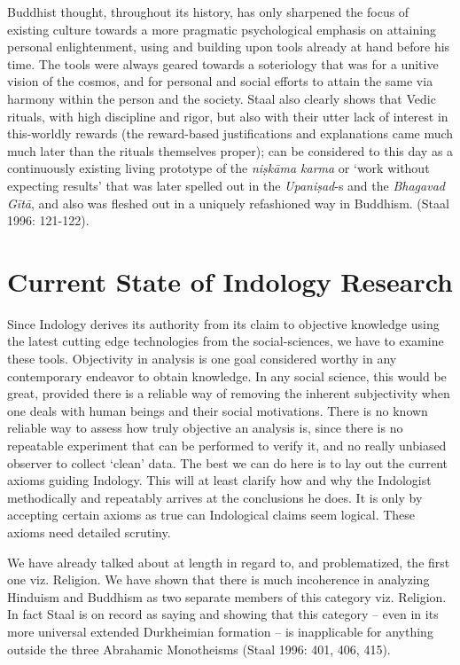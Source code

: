 Buddhist thought, throughout its history, has only sharpened the focus of existing culture towards a more pragmatic psychological emphasis on attaining personal enlightenment, using and building upon tools already at hand before his time. The tools were always geared towards a soteriology that was for a unitive vision of the cosmos, and for personal and social efforts to attain the same via harmony within the person and the society. Staal also clearly shows that Vedic rituals, with high discipline and rigor, but also with their utter lack of interest in this-worldly rewards (the reward-based justifications and explanations came much much later than the rituals themselves proper); can be considered to this day as a continuously existing living prototype of the \textit{niṣkāma karma} or ‘work without expecting results’ that was later spelled out in the \textit{Upaniṣad}-s and the \textit{Bhagavad Gītā}, and also was fleshed out in a uniquely refashioned way in Buddhism. (Staal 1996: 121-122).


\section*{Current State of Indology Research}

Since Indology derives its authority from its claim to objective knowledge using the latest cutting edge technologies from the social-sciences, we have to examine these tools. Objectivity in analysis is one goal considered worthy in any contemporary endeavor to obtain knowledge. In any social science, this would be great, provided there is a reliable way of removing the inherent subjectivity when one deals with human beings and their social motivations. There is no known reliable way to assess how truly objective an analysis is, since there is no repeatable experiment that can be performed to verify it, and no really unbiased observer to collect ‘clean’ data. The best we can do here is to lay out the current axioms guiding Indology. This will at least clarify how and why the Indologist methodically and repeatably arrives at the conclusions he does. It is only by accepting certain axioms as true can Indological claims seem logical. These axioms need detailed scrutiny.

We have already talked about at length in regard to, and problematized, the first one viz. Religion. We have shown that there is much incoherence in analyzing Hinduism and Buddhism as two separate members of this category viz. Religion. In fact Staal is on record as saying and showing that this category – even in its more universal extended Durkheimian formation – is inapplicable for anything outside the three Abrahamic Monotheisms (Staal 1996: 401, 406, 415).

